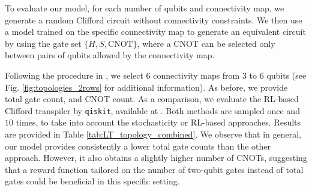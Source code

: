 \documentclass[conference]{IEEEtran}
\begin{document}
To evaluate our model, for each number of qubits and connectivity map, we generate a random Clifford circuit without connectivity constraints. We then use a model trained on the specific connectivity map to generate an equivalent circuit by using the gate set $\{H, S, \text{CNOT}\}$, where a CNOT can be selected only between pairs of qubits allowed by the connectivity map.

Following the procedure in \cite{KremerIBM}, we select $6$ connectivity maps from $3$ to $6$ qubits (see Fig. \ref{fig:topologies_2rows} for additional information).
As before, we provide total gate count, and CNOT count. As a comparison, we evaluate  the RL-based Clifford transpiler by \texttt{qiskit}, available at \cite{qiskit_ai_transpiler_cliffords}. Both methods are sampled once and $10$ times, to take into account the stochasticity or RL-based approaches. Results are provided in Table \ref{tab:LT_topology_combined}. We observe that in general, our model provides consistently a lower total gate counts than the other approach. However, it also obtains a slightly higher number of CNOTs, suggesting that a reward function tailored on the number of two-qubit gates instead of total gates could be beneficial in this specific setting.
\end{document}
